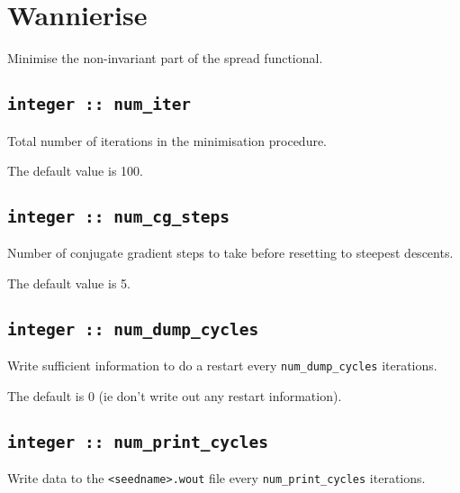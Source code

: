 \section{Wannierise}
Minimise the non-invariant part of the spread functional.

\subsection[num\_iter]{\tt integer :: num\_iter}

Total number of iterations in the minimisation procedure.

The default value is 100.

\subsection[num\_cg\_steps]{\tt integer :: num\_cg\_steps}

Number of conjugate gradient steps to take before resetting to steepest descents.

The default value is 5.







\subsection[num\_dump\_cycles]{\tt integer :: num\_dump\_cycles}
Write sufficient information to do a restart every
\verb#num_dump_cycles# iterations.

The default is 0 (ie don't write out any restart information).

\subsection[num\_print\_cycles]{\tt integer :: num\_print\_cycles}
Write data to the {\tt <seedname>.wout} file every
\verb#num_print_cycles# iterations.

